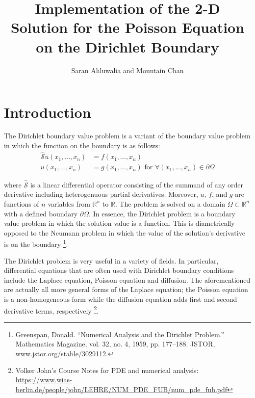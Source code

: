 \documentclass[10pt,a4paper]{article}
\author{Saran Ahluwalia and Mountain Chan}
\title{Implementation of the 2-D Solution for the Poisson Equation on the Dirichlet Boundary}
\begin{document}
\maketitle



\section*{Introduction}
The Dirichlet boundary value problem is a variant of the boundary value problem in which the function on the boundary is as follows:
\begin{subequations}
  \begin{align}
  \hat{\mathcal{S}} u(x_1 , ... , x_n) &= f(x_1 , ... , x_n) \label{eqn: dirichlet 1}\\
  u(x_1, ..., x_n) &= g(x_1, ..., x_n) \,\, \text{for} \,\, \forall (x_1, ..., x_n) \in \partial\Omega \label{eqn: dirichlet 2}
  \end{align}
\end{subequations}

where $\hat{\mathcal{S}}$ is a linear differential operator consisting of the summand of any order derivative including heterogenuous partial derivatives. Moreover, $u$, $f$, and $g$ are functions of $n$ variables from $\mathbb{R}^n$ to $\mathbb{R}$. The problem is solved on a domain $\Omega \subset \mathbb{R}^n$ with a defined boundary $\partial \Omega$. In essence, the Dirichlet problem is a boundary value problem in which the solution value is a function. This is diametrically opposed to the Neumann problem in which the value of the solution's derivative is on the boundary \footnote{Greenspan, Donald. “Numerical Analysis and the Dirichlet Problem.” Mathematics Magazine, vol. 32, no. 4, 1959, pp. 177–188. JSTOR, www.jstor.org/stable/3029112.}.

The Dirichlet problem is very useful in a variety of fields. In particular, differential equations that are often used with Dirichlet boundary conditions include the  Laplace equation, Poisson equation and diffusion. The aforementioned are actually all more general forms of the Laplace equation; the Poisson equation is a non-homogeneous form while the diffusion equation adds first and second derivative terms, respectively \footnote{Volker John's Course Notes for PDE and numerical analysis: \url{https://www.wias-berlin.de/people/john/LEHRE/NUM_PDE_FUB/num_pde_fub.pdf}}.
\end{document}
